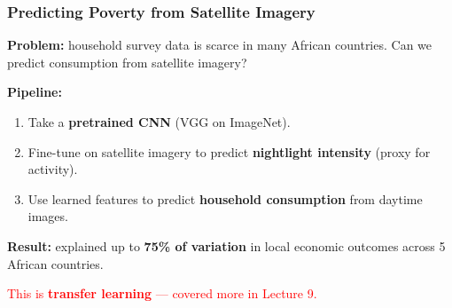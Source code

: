 \documentclass[notes,11pt, aspectratio=169]{beamer}
\begin{document}
\begin{frame}
\frametitle{Predicting Poverty from Satellite Imagery}


\vspace{4pt}
\textbf{Problem:} household survey data is scarce in many African countries. Can we predict consumption from satellite imagery?

\vspace{4pt}
\textbf{Pipeline:}
\begin{enumerate}
    \item Take a \textbf{pretrained CNN} (VGG on ImageNet).
    \item Fine-tune on satellite imagery to predict \textbf{nightlight intensity} (proxy for activity).
    \item Use learned features to predict \textbf{household consumption} from daytime images.
\end{enumerate}

\vspace{4pt}
\textbf{Result:} explained up to \textbf{75\% of variation} in local economic outcomes across 5 African countries.

\textcolor{red}{This is \textbf{transfer learning} --- covered more in Lecture 9.}
\end{frame}
\end{document}
